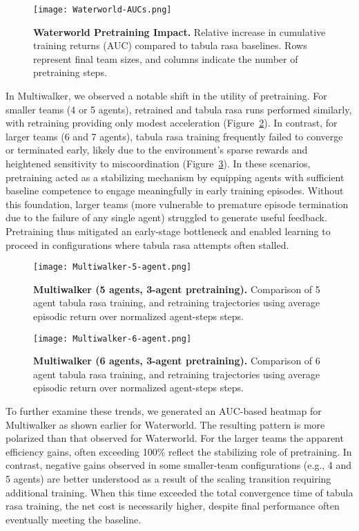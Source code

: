 \documentclass{article}
\begin{document}
\begin{figure}[h]
    \centering
    \texttt{[image: Waterworld-AUCs.png]}
    \caption{\textbf{Waterworld Pretraining Impact.} 
    Relative increase in cumulative training returns (AUC) compared to tabula rasa baselines. 
    Rows represent final team sizes, and columns indicate the number of pretraining steps.}
    \label{fig:waterworld-aucs}
\end{figure}

In Multiwalker, we observed a notable shift in the utility of pretraining. 
For smaller teams (4 or 5 agents), retrained and tabula rasa runs performed similarly, 
with retraining providing only modest acceleration (Figure~\ref{fig:multiwalker-5}). 
In contrast, for larger teams (6 and 7 agents), tabula rasa training frequently failed to 
converge or terminated early, likely due to the environment's sparse rewards and heightened 
sensitivity to miscoordination (Figure~\ref{fig:multiwalker-6}). 
In these scenarios, pretraining acted as a stabilizing mechanism by equipping agents 
with sufficient baseline competence to engage meaningfully in early training episodes. 
Without this foundation, larger teams (more vulnerable to premature episode termination 
due to the failure of any single agent) struggled to generate useful feedback. 
Pretraining thus mitigated an early-stage bottleneck and enabled learning to proceed 
in configurations where tabula rasa attempts often stalled.

\begin{figure}[!h]
    \centering
    \texttt{[image: Multiwalker-5-agent.png]}
    \caption{\textbf{Multiwalker (5 agents, 3-agent pretraining).} Comparison of 
    5 agent tabula rasa training, and retraining trajectories using average 
    episodic return over normalized agent-steps steps.}
    \label{fig:multiwalker-5}
\end{figure}

\vspace{2em}

\begin{figure}[!h]
    \centering
    \texttt{[image: Multiwalker-6-agent.png]}
    \caption{\textbf{Multiwalker (6 agents, 3-agent pretraining).} Comparison of 
    6 agent tabula rasa training, and retraining trajectories using average 
    episodic return over normalized agent-steps steps.}
    \label{fig:multiwalker-6}
\end{figure}

To further examine these trends, we generated an AUC-based heatmap for Multiwalker as shown 
earlier for Waterworld. The resulting pattern is more polarized than that observed for Waterworld.
For the larger teams the apparent efficiency gains, often exceeding 100\%
reflect the stabilizing role of pretraining.
In contrast, negative gains observed in some smaller-team configurations (e.g., 4 and 5 agents) 
are better understood as a result of the scaling transition requiring additional training. 
When this time exceeded the total convergence time of tabula rasa training, the net cost 
is necessarily higher, despite final performance often eventually meeting the baseline.
\end{document}

